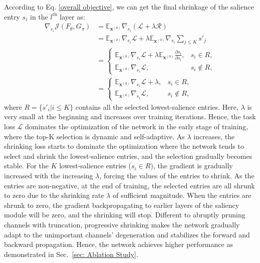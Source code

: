 \documentclass[lettersize,journal]{IEEEtran}
\begin{document}
According to Eq. \eqref{overall objective}, we can get the final shrinkage of the salience entry $s_i$ in the $l^{\text{th}}$ layer as: 
\begin{equation}
    \begin{aligned}
  \nabla_{s_i} \mathcal{J}(F_{\theta},G_{\pi})&=
  \mathbb{E}_{\boldsymbol{x}^{(0)}}\nabla_{s_i} (\mathcal{L}+\lambda \mathcal{R})\\
  &=\mathbb{E}_{\boldsymbol{x}^{(0)}}\nabla_{s_i} \mathcal{L}+\lambda\mathbb{E}_{\boldsymbol{x}^{(0)}}\nabla_{s_i}\sum_{j\leq K} s'_j\\
  &=\left \{
    \begin{array}{ll}
      \mathbb{E}_{\boldsymbol{x}^{(0)}}\nabla_{s_i} \mathcal{L}+\lambda\mathbb{E}_{\boldsymbol{x}^{(0)}}\frac{\partial s_i}{\partial s_i}, & s_i\in R,\\
      \mathbb{E}_{\boldsymbol{x}^{(0)}}\nabla_{s_i} \mathcal{L} ,     & s_i\notin R,
    \end{array}
  \right.\\
  &=\left \{
    \begin{array}{ll}
      \mathbb{E}_{\boldsymbol{x}^{(0)}}\nabla_{s_i} \mathcal{L}+\lambda, & s_i\in R,\\
      \mathbb{E}_{\boldsymbol{x}^{(0)}}\nabla_{s_i} \mathcal{L} ,     & s_i\notin R,
    \end{array}
  \right.
\label{eq:PCSGrad}
\end{aligned}
\end{equation}
where $R=\{s'_i|i\leq K\}$ contains all the selected lowest-salience entries.
Here, $\lambda$ is very small at the beginning and increases over training iterations. Hence, the task loss $\mathcal{L}$ dominates the optimization of the network in the early stage of training, where the top-K selection is dynamic and self-adaptive. As $\lambda$ increases, the shrinking loss starts to dominate the optimization where the network tends to select and shrink the lowest-salience entries, and the selection gradually becomes stable. For the $K$ lowest-salience entries ($s_i\in R$), the gradient is gradually increased with the increasing  $\lambda$, forcing the values of the entries to shrink.  As the entries are non-negative, at the end of training, the selected entries are all shrunk to zero due to the shrinking rate $\lambda$ of sufficient magnitude.  When the entries are shrunk to zero, the gradient backpropagating to earlier
layers of the saliency module will be zero, and the shrinking will stop. 
Different to abruptly pruning channels with truncation, progressive shrinking makes the network gradually adapt to the unimportant channels' degeneration and stabilizes the forward and backward propagation. Hence, the network achieves higher performance as demonstrated in Sec.~\ref{sec: Ablation Study}. 
\end{document}
